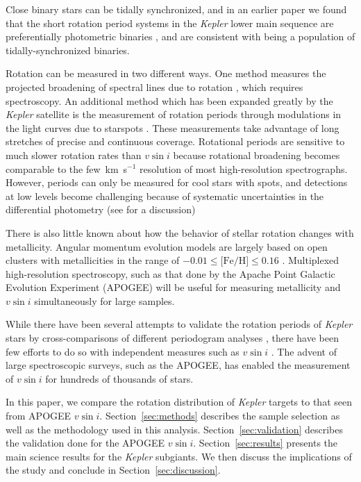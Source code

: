 \documentclass[preprint2]{aastex62}
\newcommand{\vsini}{\ensuremath{v \sin i}}
\newcommand{\Kepler}{\mbox{\textit{Kepler}}}
\newcommand{\kms}{\textrm{km~s}\ensuremath{^{-1}}}
\newcommand{\feh}{\textrm{[Fe/H]}}
\begin{document}
Close binary stars can be tidally synchronized, and in an earlier paper we
found that the short rotation period systems in the \Kepler{} lower main
sequence are preferentially photometric binaries \citep{Simonian19}, and are
consistent with being a population of tidally-synchronized binaries. 

Rotation can be measured in two different ways. One method measures
the projected broadening of spectral lines due to rotation \citep{Kahler89},
which requires spectroscopy.  An additional method
which has been expanded greatly by the \Kepler{} satellite is the measurement
of rotation periods through modulations in the light curves due to starspots
\citep[see][and references therein]{McQuillan14,Garcia14, Aigrain15,Luri18}.
These measurements take advantage of long stretches of precise and continuous
coverage. Rotational periods are sensitive to
much slower rotation rates than \vsini{} because rotational broadening becomes
comparable to the few~\kms{} resolution of most high-resolution spectrographs. 
However, periods can only be measured for cool stars with spots, and detections at
low levels become challenging because of systematic uncertainties in the
differential photometry (see \citealt{vanSaders19} for a discussion)

There is also little known about
how the behavior of stellar rotation changes with metallicity. Angular momentum evolution models are largely based on open clusters with metallicities in the range of \(-0.01 \le \feh \le 0.16\) \citep{Netopil16}.
Multiplexed high-resolution spectroscopy, such as that done by the Apache Point Galactic Evolution Experiment (APOGEE) will
be useful for measuring metallicity and \vsini{} simultaneously for large
samples.

While there have been several attempts to validate the rotation periods of
\Kepler{} stars by cross-comparisons of different periodogram analyses
\citep[see][]{Aigrain15}, there
have been few efforts to do so with independent measures
such as \vsini{} \citep[see][for a comparison in M dwarfs]{Gilhool18}. The advent of large spectroscopic
surveys, such as the APOGEE, has
enabled the measurement of \vsini{} for hundreds of thousands of stars.

In this paper, we compare the rotation distribution of \Kepler{} targets to
that seen from APOGEE \vsini{}. Section~\ref{sec:methods} describes the sample
selection as well as the methodology used in this analysis. 
Section~\ref{sec:validation} describes the validation done for the APOGEE
\vsini.  Section~\ref{sec:results} presents the main science results for the
\Kepler{} subgiants. We then discuss the implications of the study and conclude
in Section~\ref{sec:discussion}. 
\end{document}
